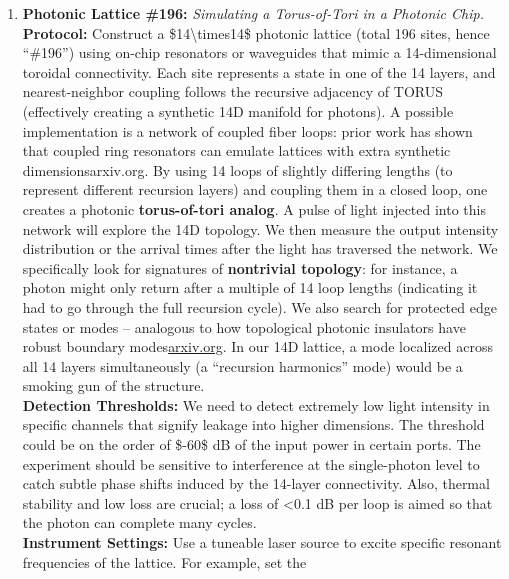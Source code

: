 \documentclass[]{article}
\begin{document}
\begin{enumerate}
\def\labelenumi{\arabic{enumi}.}
\item
  \textbf{Photonic Lattice \#196:} \emph{Simulating a Torus-of-Tori in a
  Photonic Chip.}\\
  \textbf{Protocol:} Construct a \$14\textbackslash{}times14\$ photonic
  lattice (total 196 sites, hence ``\#196'') using on-chip resonators or
  waveguides that mimic a 14-dimensional toroidal connectivity. Each
  site represents a state in one of the 14 layers, and nearest-neighbor
  coupling follows the recursive adjacency of TORUS (effectively
  creating a synthetic 14D manifold for photons). A possible
  implementation is a network of coupled fiber loops: prior work has
  shown that coupled ring resonators can emulate lattices with extra
  synthetic dimensions​arxiv.org. By using 14 loops of slightly
  differing lengths (to represent different recursion layers) and
  coupling them in a closed loop, one creates a photonic
  \textbf{torus-of-tori analog}. A pulse of light injected into this
  network will explore the 14D topology. We then measure the output
  intensity distribution or the arrival times after the light has
  traversed the network. We specifically look for signatures of
  \textbf{nontrivial topology}: for instance, a photon might only return
  after a multiple of 14 loop lengths (indicating it had to go through
  the full recursion cycle). We also search for protected edge states or
  modes -- analogous to how topological photonic insulators have robust
  boundary
  modes​\href{https://arxiv.org/abs/2104.03726\#:~:text=waveguides,also\%20exhibit\%20robust\%20transport\%20when}{arxiv.org}.
  In our 14D lattice, a mode localized across all 14 layers
  simultaneously (a ``recursion harmonics'' mode) would be a smoking gun
  of the structure.\\
  \textbf{Detection Thresholds:} We need to detect extremely low light
  intensity in specific channels that signify leakage into higher
  dimensions. The threshold could be on the order of \$-60\$ dB of the
  input power in certain ports. The experiment should be sensitive to
  interference at the single-photon level to catch subtle phase shifts
  induced by the 14-layer connectivity. Also, thermal stability and low
  loss are crucial; a loss of \textless{}0.1 dB per loop is aimed so
  that the photon can complete many cycles.\\
  \textbf{Instrument Settings:} Use a tuneable laser source to excite
  specific resonant frequencies of the lattice. For example, set the

\end{enumerate}
\end{document}
